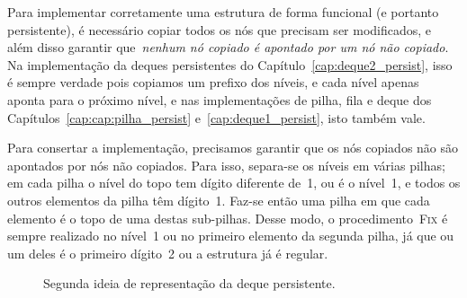\documentclass[main.tex]{subfiles}
\begin{document}
Para implementar corretamente uma estrutura de forma funcional (e portanto persistente), é necessário copiar todos os nós que precisam ser modificados, e além disso garantir que~\emph{nenhum nó copiado é apontado por um nó não copiado}. Na implementação da deques persistentes do Capítulo~\ref{cap:deque2_persist}, isso é sempre verdade pois copiamos um prefixo dos níveis, e cada nível apenas aponta para o próximo nível, e nas implementações de pilha, fila e deque dos Capítulos~\ref{cap:cap:pilha_persist} e~\ref{cap:deque1_persist}, isto também vale.

Para consertar a implementação, precisamos garantir que os nós copiados não são apontados por nós não copiados. Para isso, separa-se os níveis em várias pilhas; em cada pilha o nível do topo tem dígito diferente de~1, ou é o nível~1, e todos os outros elementos da pilha têm dígito~1. Faz-se então uma pilha em que cada elemento é o topo de uma destas sub-pilhas. Desse modo, o procedimento~\textsc{Fix} é sempre realizado no nível~1 ou no primeiro elemento da segunda pilha, já que ou um deles é o primeiro dígito~2 ou a estrutura já é regular.

\begin{figure}
\centering
{}
\caption{Segunda ideia de representação da deque persistente.} \label{fig:func_ex2}
\end{figure}
\end{document}
